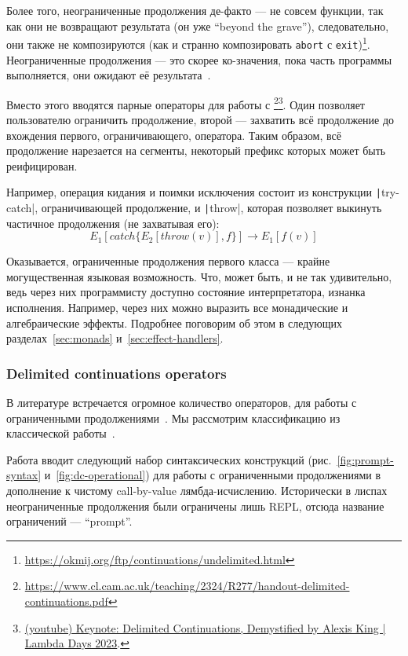 Более того, неограниченные продолжения де-факто --- не совсем функции, так как они не возвращают результата (он уже ``beyond the grave''), следовательно, они также не композируются (как и странно композировать \texttt{abort} с \texttt{exit})\footnote{\url{https://okmij.org/ftp/continuations/undelimited.html}}.
Неограниченные продолжения --- это скорее ко-значения, пока часть программы выполняется, они ожидают её результата~\cite{curien2000duality}.

Вместо этого вводятся парные операторы для работы с \footnote{\url{https://www.cl.cam.ac.uk/teaching/2324/R277/handout-delimited-continuations.pdf}}\footnote{\href{https://youtu.be/TE48LsgVlIU?si=cBdUCzYwYWpwPkkh}{(youtube)  Keynote: Delimited Continuations, Demystified by Alexis King | Lambda Days 2023}.}.
Один позволяет пользователю ограничить продолжение, второй --- захватить всё продолжение до вхождения первого, ограничивающего, оператора.
Таким образом, всё продолжение нарезается на сегменты, некоторый префикс которых может быть реифицирован.

Например, операция кидания и поимки исключения состоит из конструкции \texttt|try-catch|, ограничивающей продолжение, и \texttt|throw|, которая позволяет выкинуть частичное продолжения (не захватывая его):
\[
    E_1[catch\{E_2[throw(v)], f\}] \to E_1[f(v)]
\]

Оказывается, ограниченные продолжения первого класса --- крайне могущественная языковая возможность.
Что, может быть, и не так удивительно, ведь через них программисту доступно состояние интерпретатора, изнанка исполнения.
Например, через них можно выразить все монадические и алгебраические эффекты.
Подробнее поговорим об этом в следующих разделах~\ref{sec:monads} и~\ref{sec:effect-handlers}.

\subsubsection{Delimited continuations operators}

В литературе встречается огромное количество операторов, для работы с ограниченными продолжениями~\cite[приложение А]{hillerstrom2022foundations}.
Мы рассмотрим классификацию из классической работы~\cite{dyvbig2007monadic}.

Работа вводит следующий набор синтаксических конструкций (рис.~\ref{fig:prompt-syntax} и~\ref{fig:dc-operational}) для работы с ограниченными продолжениями в дополнение к чистому call-by-value лямбда-исчислению.
Исторически в лиспах неограниченные продолжения были ограничены лишь REPL, отсюда название ограничений --- ``prompt''.

